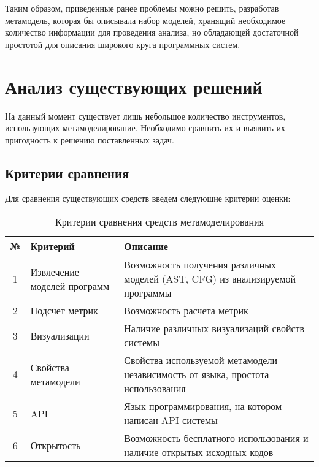 Таким образом, приведенные ранее проблемы можно решить, разработав метамодель,
которая бы описывала набор моделей, хранящий необходимое количество информации
для проведения анализа, но обладающей достаточной простотой для описания
широкого круга программных систем.

\section{Анализ существующих решений}
\label{sec:analysis}

На данный момент существует лишь небольшое количество инструментов, использующих
метамоделирование. Необходимо сравнить их и выявить их пригодность к решению
поставленных задач.

\subsection{Критерии сравнения}
\label{subsec:criterions}

Для сравнения существующих средств введем следующие критерии оценки:

\begin{table}[ht]
\caption{Критерии сравнения средств метамоделирования}
\begin{tabularx}{\textwidth}{|c|X|X|}
\hline
№ & Критерий & Описание \\ \hline
1 & Извлечение моделей программ & Возможность получения различных моделей (AST, CFG) из анализируемой программы \\ \hline
2 & Подсчет метрик & Возможность расчета метрик \\ \hline
3 & Визуализации & Наличие различных визуализаций свойств системы \\ \hline
4 & Свойства метамодели & Свойства используемой метамодели - независимость от языка, простота использования \\ \hline
5 & API & Язык программирования, на котором написан API системы \\ \hline
6 & Открытость & Возможность бесплатного использования и наличие открытых исходных кодов \\ \hline
\end{tabularx}
\end{table}

